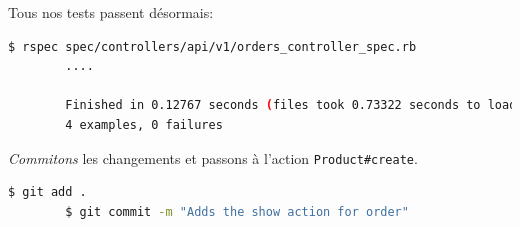 \documentclass[]{report}
\begin{document}
      Tous nos tests passent désormais:

      \begin{scriptsize}
        \begin{lstlisting}[language=bash]
        $ rspec spec/controllers/api/v1/orders_controller_spec.rb
        ....

        Finished in 0.12767 seconds (files took 0.73322 seconds to load)
        4 examples, 0 failures
        \end{lstlisting}
      \end{scriptsize}


      \textit{Commitons} les changements et passons à l'action \verb|Product#create|.

      \begin{scriptsize}
        \begin{lstlisting}[language=bash]
        $ git add .
        $ git commit -m "Adds the show action for order"
        \end{lstlisting}
      \end{scriptsize}
\end{document}

